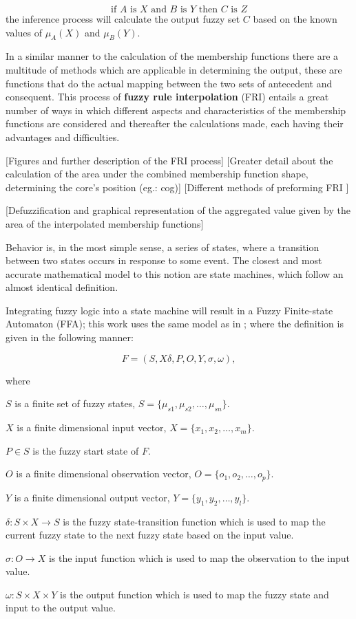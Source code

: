 \[
	\text{if } A \text{ is } X \text{ and } B \text{ is } Y \text{ then } C \text{ is } Z
\]
the inference process will calculate the output fuzzy set $C$ based on the known values of $\mu_A(X)$ and $\mu_B(Y)$.

In a similar manner to the calculation of the membership functions there are a multitude of methods which are applicable in determining the output, these are functions that do the actual mapping between the two sets of antecedent and consequent. This process of \textbf{fuzzy rule interpolation} (FRI) entails a great number of ways in which different aspects and characteristics of the membership functions are considered and thereafter the calculations made, each having their advantages and difficulties.

[Figures and further description of the FRI process]
[Greater detail about the calculation of the area under the combined membership function shape, determining the core's position (eg.: cog)]
[Different methods of preforming FRI \cite{kovacsjohanyak2018}]
		
[Defuzzification and graphical representation of the aggregated value given by the area of the interpolated membership functions]

Behavior is, in the most simple sense, a series of states, where a transition between two states occurs in response to some event. The closest and most accurate mathematical model to this notion are state machines, which follow an almost identical definition. 

Integrating fuzzy logic into a state machine will result in a Fuzzy Finite-state Automaton (FFA); this work uses the same model as in \cite{pillerkovacs2015}; where the definition is given in the following manner:

\[
	F = (S, X \delta, P, O, Y, \sigma, \omega),
\]

\noindent where

\hspace*{0.5cm}%
\begin{minipage}{.8\textwidth}%
       $S$ is a finite set of fuzzy states, $S = \{\mu_{s1}, \mu_{s2}, \ldots, \mu_{sn}\}$.

      $X$ is a finite dimensional input vector, $X = \{x_1, x_2, \ldots, x_m\}$.

      $P \in S$ is the fuzzy start state of $F$.
      
     $O$ is a finite dimensional observation vector, $O = \{o_1, o_2, \ldots, o_p\}$.
	
	$Y$ is a finite dimensional output vector, $Y = \{y_1, y_2, \ldots, y_l\}$.
	
	$\delta : S \times X \rightarrow S$ is the fuzzy state-transition function which is used to map the current fuzzy state to the next fuzzy state based on the input value.
	
	$\sigma : O \rightarrow X$ is the input function which is used to map the observation to the input value.
	
	$\omega : S \times X \times Y$ is the output function which is used to map the fuzzy state and input to the output value.
\end{minipage}%

